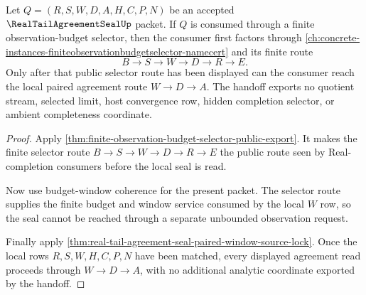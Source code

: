 \begin{theorem}
\label{thm:real-tail-agreement-seal-selector-budget-handoff}
Let $Q=(R,S,W,D,A,H,C,P,N)$ be an accepted $\RealTailAgreementSealUp$ packet. If $Q$ is consumed through a finite observation-budget selector, then the consumer first factors through \autoref{ch:concrete-instances-finiteobservationbudgetselector-namecert} and its finite route
$$
B \to S \to W \to D \to R \to E.
$$
Only after that public selector route has been displayed can the consumer reach the local paired agreement route $W \to D \to A$. The handoff exports no quotient stream, selected limit, host convergence row, hidden completion selector, or ambient completeness coordinate.
\end{theorem}
\begin{proof}
Apply \autoref{thm:finite-observation-budget-selector-public-export}. It makes the finite selector route $B \to S \to W \to D \to R \to E$ the public route seen by Real-completion consumers before the local seal is read.

Now use budget-window coherence for the present packet. The selector route supplies the finite budget and window service consumed by the local $W$ row, so the seal cannot be reached through a separate unbounded observation request.

Finally apply \autoref{thm:real-tail-agreement-seal-paired-window-source-lock}. Once the local rows $R,S,W,H,C,P,N$ have been matched, every displayed agreement read proceeds through $W \to D \to A$, with no additional analytic coordinate exported by the handoff.
\end{proof}

